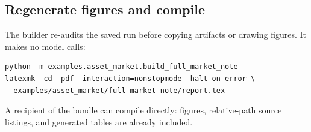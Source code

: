 \documentclass[11pt,letterpaper]{article}
\begin{document}
\subsection{Regenerate figures and compile}
The builder re-audits the saved run before copying artifacts or drawing figures.
It makes no model calls:
\begin{lstlisting}[language={},numbers=none]
python -m examples.asset_market.build_full_market_note
latexmk -cd -pdf -interaction=nonstopmode -halt-on-error \
  examples/asset_market/full-market-note/report.tex
\end{lstlisting}
A recipient of the bundle can compile  directly: figures,
relative-path source listings, and generated tables are already included.
\endgroup
\end{document}
